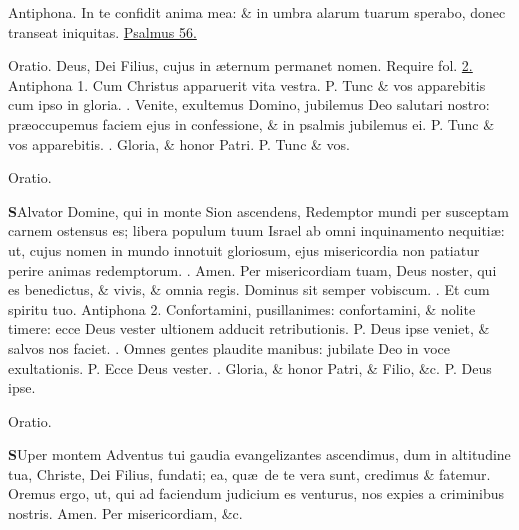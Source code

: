 \documentclass[letter,11pt]{book}
\makeatletter
\DeclareRobustCommand{\Vbar}{\vers@resp{-0.1em}{V}}
\DeclareRobustCommand{\Rbar}{\vers@resp{0pt}{R}}
\newcommand{\vers@resp@sym}{\raisebox{0.2ex}{\rotatebox[origin=c]{-20}{$\m@th\rceil$}}}
\newcommand{\vers@resp}[2]{%
  {\ooalign{\hidewidth\kern#1\vers@resp@sym\hidewidth\cr#2\cr}}%
}%
\def\P{\color{Red} P. \color{black}}
\def\V{\color{Red} \Vbar . \color{black}}
\def\R{\color{Red} \Rbar . \color{black}}
\makeatother
\begin{document}
\begin{multicols}{2}
\par \noindent \color{Red} Antiphona. \color{black} In te confidit anima mea: \& in umbra alarum tuarum sperabo, donec transeat iniquitas. \color{Red} \hyperlink{ps56}{Psalmus 56.} \color{black}
\par \noindent \color{Red} Oratio. \color{black} Deus, Dei Filius, cujus in \ae ternum permanet nomen. \color{Red} Require fol. \color{black} \hyperlink{page.2}{2.}
\newline \color{Red} Antiphona 1. \color{black} Cum Christus apparuerit vita vestra. \P Tunc \& vos apparebitis cum ipso in gloria. \V Venite, exultemus Domino, jubilemus Deo salutari nostro: pr\ae occupemus faciem ejus in confessione, \& in psalmis jubilemus ei. \P Tunc \& vos apparebitis. \V Gloria, \& honor Patri. \P Tunc \& vos.
\vspace{-.75em} \begin{center} \color{Red} Oratio. \end{center} \vspace{-.75em}
\lettrine[lines=2]{\bfseries \color{Red} S}{}Alvator Domine, qui in monte Sion ascendens, Redemptor mundi per susceptam carnem ostensus es; libera populum tuum Israel ab omni inquinamento nequiti\ae : ut, cujus nomen in mundo innotuit gloriosum, ejus misericordia non patiatur perire animas redemptorum. \R Amen. Per misericordiam tuam, Deus noster, qui es benedictus, \& vivis, \& omnia regis. Dominus sit semper vobiscum. \R Et cum spiritu tuo.
\newline \color{Red} Antiphona 2. \color{black} Confortamini, pusillanimes: confortamini, \& nolite timere: ecce Deus vester ultionem adducit retributionis. \P Deus ipse veniet, \& salvos nos faciet. \V Omnes gentes plaudite manibus: jubilate Deo in voce exultationis. \P Ecce Deus vester. \V Gloria, \& honor Patri, \& Filio, \&c. \P Deus ipse.
\vspace{-1.25em} \begin{center} \color{Red} Oratio. \end{center} \vspace{-.75em}
\lettrine[lines=2]{\bfseries \color{Red} S}{}Uper montem Adventus tui gaudia evangelizantes ascendimus, dum in altitudine tua, Christe, Dei Filius, fundati; ea, qu\ae \ de te vera sunt, credimus \& fatemur. Oremus ergo, ut, qui ad faciendum judicium es venturus, nos expies a criminibus nostris. Amen. Per misericordiam, \&c.

\end{multicols}
\end{document}
